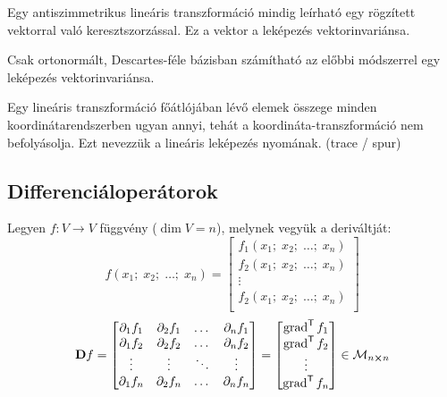 \documentclass[main.tex]{subfiles}
\begin{document}
Egy antiszimmetrikus lineáris transzformáció
mindig leírható egy rögzített vektorral
való keresztszorzással. Ez a vektor a leképezés
vektorinvariánsa.



Csak ortonormált, Descartes-féle bázisban
számítható az előbbi módszerrel egy leképezés
vektorinvariánsa.



Egy lineáris transzformáció főátlójában lévő
elemek összege minden koordinátarendszerben
ugyan annyi, tehát a koordináta-transzformáció
nem befolyásolja. Ezt nevezzük a lineáris
leképezés nyomának. (trace / spur)

\subsection{Differenciáloperátorok}

Legyen $f: V \rightarrow V$ függvény ($\dim V = n$),
melynek vegyük a deriváltját:
\begin{equation*}
  f \left( x_1; \; x_2; \; \dots ; \; x_n \right)
  =
  \begin{bmatrix}
    f_1 \left( x_1; \; x_2; \; \dots ; \; x_n \right) \\
    f_2 \left( x_1; \; x_2; \; \dots ; \; x_n \right) \\
    \vdots                                            \\
    f_2 \left( x_1; \; x_2; \; \dots ; \; x_n \right) \\
  \end{bmatrix}
\end{equation*}
\begin{equation*}
  \mathbf{D} f
  =
  \begin{bmatrix}
    \partial_1 f_1 & \partial_2 f_1 & \dots  & \partial_n f_1 \\
    \partial_1 f_2 & \partial_2 f_2 & \dots  & \partial_n f_2 \\
    \vdots         & \vdots         & \ddots & \vdots         \\
    \partial_1 f_n & \partial_2 f_n & \dots  & \partial_n f_n
  \end{bmatrix}
  =
  \begin{bmatrix}
    \operatorname{grad}^{\mathsf{T}} f_1 \\
    \operatorname{grad}^{\mathsf{T}} f_2 \\
    \vdots               \\
    \operatorname{grad}^{\mathsf{T}} f_n \\
  \end{bmatrix}
  \in
  \mathcal{M}_{n \cross n}
\end{equation*}
\end{document}

